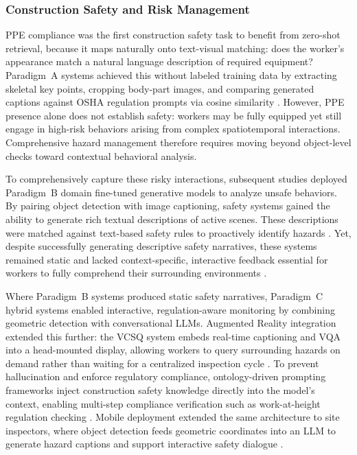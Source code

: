 \documentclass[10pt,letterpaper]{article}
\begin{document}
\subsubsection{Construction Safety and Risk Management}

PPE compliance was the first construction safety task to benefit from zero-shot retrieval, because it maps naturally onto text-visual matching: does the worker's appearance match a natural language description of required equipment? Paradigm~A systems achieved this without labeled training data by extracting skeletal key points, cropping body-part images, and comparing generated captions against OSHA regulation prompts via cosine similarity \cite{gil2024}. However, PPE presence alone does not establish safety: workers may be fully equipped yet still engage in high-risk behaviors arising from complex spatiotemporal interactions. Comprehensive hazard management therefore requires moving beyond object-level checks toward contextual behavioral analysis.

To comprehensively capture these risky interactions, subsequent studies deployed Paradigm~B domain fine-tuned generative models to analyze unsafe behaviors. By pairing object detection with image captioning, safety systems gained the ability to generate rich textual descriptions of active scenes. These descriptions were matched against text-based safety rules to proactively identify hazards \cite{wangxiao2024}. Yet, despite successfully generating descriptive safety narratives, these systems remained static and lacked context-specific, interactive feedback essential for workers to fully comprehend their surrounding environments \cite{chen2024}.

Where Paradigm~B systems produced static safety narratives, Paradigm~C hybrid systems enabled interactive, regulation-aware monitoring by combining geometric detection with conversational LLMs. Augmented Reality integration extended this further: the VCSQ system embeds real-time captioning and VQA into a head-mounted display, allowing workers to query surrounding hazards on demand rather than waiting for a centralized inspection cycle \cite{chen2024}. To prevent hallucination and enforce regulatory compliance, ontology-driven prompting frameworks inject construction safety knowledge directly into the model's context, enabling multi-step compliance verification such as work-at-height regulation checking \cite{chan2025}. Mobile deployment extended the same architecture to site inspectors, where object detection feeds geometric coordinates into an LLM to generate hazard captions and support interactive safety dialogue \cite{hussain2026}.
\end{document}
